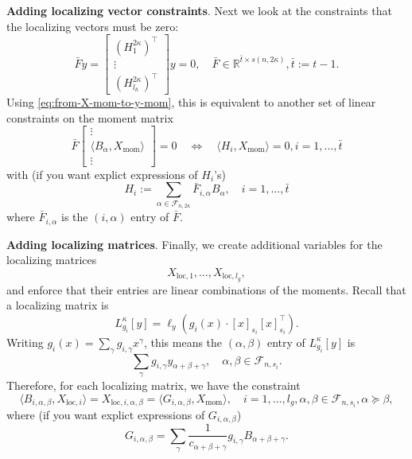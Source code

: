 \documentclass[
]{book}
\theoremstyle{definition}
\theoremstyle{definition}
\theoremstyle{definition}
\theoremstyle{definition}
\theoremstyle{remark}
\begin{document}
\textbf{Adding localizing vector constraints}. Next we look at the constraints that the localizing vectors must be zero:
\[
\bar{F}y =
\begin{bmatrix}
(H_1^{2\kappa})^\top\\
\vdots \\
(H_{l_h}^{2\kappa})^\top
\end{bmatrix} y = 0, \quad \bar{F} \in \mathbb{R}^{\bar{t} \times s(n,2\kappa)}, \bar{t}:=t-1.
\]
Using \eqref{eq:from-X-mom-to-y-mom}, this is equivalent to another set of linear constraints on the moment matrix
\begin{equation}
\bar{F} \begin{bmatrix}
\vdots \\
\langle B_{\alpha}, X_{\mathrm{mom}} \rangle\\
\vdots 
\end{bmatrix} = 0 \quad \Leftrightarrow \quad \langle H_i, X_{\mathrm{mom}} \rangle = 0, i=1,\dots,\bar{t}
\label{eq:moment-matrix-localizing-vector-constraints}
\end{equation}
with (if you want explict expressions of \(H_i\)'s)
\[
H_i := \sum_{\alpha \in \mathcal{F}_{n,2\kappa}} \bar{F}_{i,\alpha} B_{\alpha}, \quad i=1,\dots,\bar{t}
\]
where \(\bar{F}_{i,\alpha}\) is the \((i,\alpha)\) entry of \(\bar{F}\).

\textbf{Adding localizing matrices}. Finally, we create additional variables for the localizing matrices
\[
X_{\mathrm{loc},1},\dots,X_{\mathrm{loc},l_g},
\]
and enforce that their entries are linear combinations of the moments. Recall that a localizing matrix is
\[
L_{g_i}^{\kappa}[y] = \ell_y \left( g_i(x)\cdot [x]_{s_i}[x]_{s_i}^\top\right).
\]
Writing \(g_i(x) = \sum_\gamma g_{i,\gamma} x^{\gamma}\), this means the \((\alpha,\beta)\) entry of \(L_{g_i}^{\kappa}[y]\) is
\[
\sum_{\gamma} g_{i,\gamma} y_{\alpha+\beta+\gamma}, \quad \alpha,\beta \in \mathcal{F}_{n,s_i}.
\]
Therefore, for each localizing matrix, we have the constraint
\begin{equation}
\langle B_{i,\alpha,\beta}, X_{\mathrm{loc},i} \rangle = X_{\mathrm{loc},i,\alpha,\beta} = \langle G_{i,\alpha,\beta}, X_{\mathrm{mom}} \rangle, \quad i=1,\dots,l_g, \alpha,\beta \in \mathcal{F}_{n,s_i}, \alpha \succeq \beta,
\label{eq:moment-matrix-localizing-matrix-constraints}
\end{equation}
where (if you want explict expressions of \(G_{i,\alpha,\beta}\))
\[
G_{i,\alpha,\beta} = \sum_{\gamma} \frac{1}{c_{\alpha+\beta+\gamma}} g_{i,\gamma} B_{\alpha+\beta+\gamma}.
\]
\end{document}
